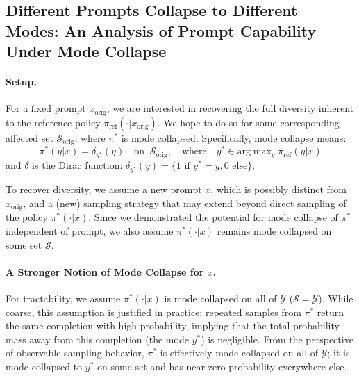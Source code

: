 \subsection{Different Prompts Collapse to Different Modes: An Analysis of Prompt Capability Under Mode Collapse}
\label{appendix:anthony's proof on the mode for different prompts}
\paragraph{Setup.} For a fixed prompt $x_\text{orig}$, we are interested in recovering the full diversity inherent to the reference policy $\pi_\text{ref}(\cdot | x_\text{orig})$. We hope to do so for some corresponding affected set $\mathcal{S}_{\text{orig}}$, where $\pi^*$ is mode collapsed. Specifically, mode collapse means:
\begin{equation}
    \pi^*(y | x) = \delta_{y^*}(y) \quad\text{on } \ \mathcal{S}_\text{orig}, \quad\text{where}\quad y^* \in \text{arg}\max\nolimits_y \pi_\text{ref}(y | x)
\end{equation}
and $\delta$ is the Dirac function: $\delta_{y^*}(y) = \{1 \text{ if }y^* = y, 0\text{ else}\}.$

To recover diversity, we assume a new prompt $x$, which is possibly distinct from $x_\text{orig}$, and a (new) sampling strategy that may extend beyond direct sampling of the policy $\pi^*(\cdot | x)$. Since we demonstrated the potential for mode collapse of $\pi^*$ independent of prompt, we also assume $\pi^*(\cdot | x)$ remains mode collapsed on some set $\mathcal{S}$.
\paragraph{A Stronger Notion of Mode Collapse for $x$.} For tractability, we assume $\pi^*(\cdot | x)$ is mode collapsed on all of $\mathcal{Y}$ ($\mathcal{S} = \mathcal{Y}$). While coarse, this assumption is justified in practice: repeated samples from $\pi^*$ return the same completion with high probability, implying that the total probability mass away from this completion (the mode $y^*$) is negligible. From the perspective of observable sampling behavior, $\pi^*$ is effectively mode collapsed on all of $\mathcal{Y}$; it is mode collapsed to $y^*$ on some set and has near-zero probability everywhere else.


